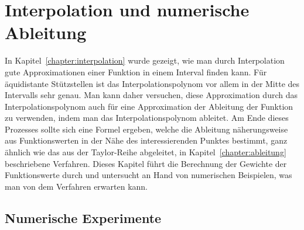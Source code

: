 %
%
%
\chapter{Interpolation und numerische Ableitung\label{chapter:interdiff}}
\rhead{}
\begin{refsection}

{\parindent0pt
In} Kapitel~\ref{chapter:interpolation} wurde gezeigt, wie man durch
Interpolation gute Approximationen einer Funktion in einem Interval
finden kann.
Für äquidistante Stützstellen ist das Interpolationspolynom vor allem in
der Mitte des Intervalls sehr genau.
Man kann daher versuchen, diese Approximation durch das Interpolationspolynom
auch für eine Approximation der Ableitung der Funktion zu verwenden, indem
man das Interpolationspolynom ableitet.
Am Ende dieses Prozesses sollte sich eine Formel ergeben, welche die
Ableitung näherungsweise aus Funktionswerten in der Nähe des
interessierenden Punktes bestimmt, ganz ähnlich wie das aus der
Taylor-Reihe abgeleitet, in Kapitel~\ref{chapter:ableitung} beschriebene
Verfahren.
Dieses Kapitel führt die Berechnung der Gewichte der Funktionswerte durch
und untersucht an Hand von numerischen Beispielen, was man von dem Verfahren
erwarten kann.





\section{Numerische Experimente}

\cite{interdiff:numerical-analysis}

\printbibliography[heading=subbibliography]
\end{refsection}
